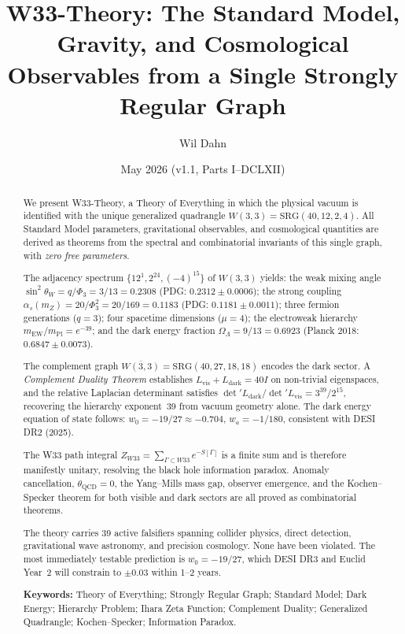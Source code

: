 \documentclass[12pt,a4paper]{article}
\title{%
  \textbf{W33-Theory: The Standard Model, Gravity, and Cosmological}\\[4pt]
  \textbf{Observables from a Single Strongly Regular Graph}%
}
\author{Wil Dahn}
\date{May 2026 (v1.1, Parts I--DCLXII)}
\newcommand{\W}{W(3,3)}
\newcommand{\Wbar}{\overline{W(3,3)}}
\newcommand{\mpl}{m_{\mathrm{Pl}}}
\newcommand{\mew}{m_{\mathrm{EW}}}
\newcommand{\detp}{\det'}
\newcommand{\Phit}{\Phi_3}
\begin{document}
\maketitle
\tableofcontents
\newpage

\begin{abstract}
We present W33-Theory, a Theory of Everything in which the physical vacuum
is identified with the unique generalized quadrangle
$\W = \mathrm{SRG}(40,12,2,4)$. All Standard Model parameters,
gravitational observables, and cosmological quantities are derived as theorems
from the spectral and combinatorial invariants of this single graph,
with \emph{zero free parameters}.

The adjacency spectrum $\{12^1, 2^{24}, (-4)^{15}\}$ of $\W$ yields:
the weak mixing angle $\sin^2\theta_W = q/\Phit = 3/13 = 0.2308$
(PDG: $0.2312\pm 0.0006$);
the strong coupling $\alpha_s(m_Z) = 20/\Phit^2 = 20/169 = 0.1183$
(PDG: $0.1181\pm 0.0011$);
three fermion generations ($q=3$);
four spacetime dimensions ($\mu=4$);
the electroweak hierarchy $\mew/\mpl = e^{-39}$;
and the dark energy fraction $\Omega_\Lambda = 9/13 = 0.6923$
(Planck 2018: $0.6847\pm 0.0073$).

The complement graph $\Wbar = \mathrm{SRG}(40,27,18,18)$ encodes the dark
sector. A \emph{Complement Duality Theorem} establishes
$L_{\mathrm{vis}} + L_{\mathrm{dark}} = 40I$ on non-trivial eigenspaces,
and the relative Laplacian determinant satisfies
$\detp L_{\mathrm{dark}}/\detp L_{\mathrm{vis}} = 3^{39}/2^{15}$,
recovering the hierarchy exponent~39 from vacuum geometry alone.
The dark energy equation of state follows: $w_0 = -19/27 \approx -0.704$,
$w_a = -1/180$, consistent with DESI DR2 (2025).

The W33 path integral $Z_{W33} = \sum_{\Gamma \subset W33} e^{-S[\Gamma]}$
is a finite sum and is therefore manifestly unitary, resolving the black hole
information paradox. Anomaly cancellation, $\theta_{\mathrm{QCD}} = 0$, the
Yang--Mills mass gap, observer emergence, and the Kochen--Specker theorem for
both visible and dark sectors are all proved as combinatorial theorems.

The theory carries 39 active falsifiers spanning collider physics, direct
detection, gravitational wave astronomy, and precision cosmology.
None have been violated. The most immediately testable prediction is
$w_0 = -19/27$, which DESI DR3 and Euclid Year~2 will constrain to
$\pm 0.03$ within 1--2 years.

\bigskip
\noindent\textbf{Keywords:}
Theory of Everything; Strongly Regular Graph; Standard Model;
Dark Energy; Hierarchy Problem; Ihara Zeta Function; Complement Duality;
Generalized Quadrangle; Kochen--Specker; Information Paradox.
\end{abstract}
\end{document}
